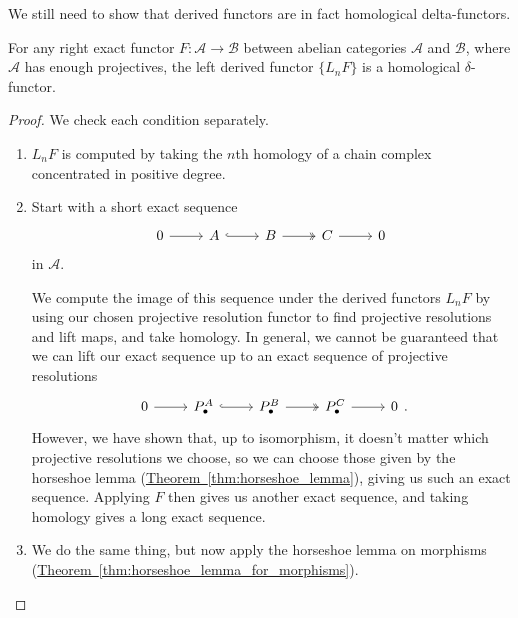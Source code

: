 \documentclass[main.tex]{subfiles}
\begin{document}
We still need to show that derived functors are in fact homological delta-functors.

\begin{theorem}
  For any right exact functor $F\colon \mathcal{A} \to \mathcal{B}$ between abelian categories $\mathcal{A}$ and $\mathcal{B}$, where $\mathcal{A}$ has enough projectives, the left derived functor $\{L_{n}F\}$ is a homological $\delta$-functor.
\end{theorem}
\begin{proof}
  We check each condition separately.
  \begin{enumerate}
    \item $L_{n}F$ is computed by taking the $n$th homology of a chain complex concentrated in positive degree.

    \item Start with a short exact sequence
      \begin{equation*}
        \begin{tikzcd}
          0
          \arrow[r]
          & A
          \arrow[r, hook]
          & B
          \arrow[r, two heads]
          & C
          \arrow[r]
          & 0
        \end{tikzcd}
      \end{equation*}
      in $\mathcal{A}$.

      We compute the image of this sequence under the derived functors $L_{n}F$ by using our chosen projective resolution functor to find projective resolutions and lift maps, and take homology. In general, we cannot be guaranteed that we can lift our exact sequence up to an exact sequence of projective resolutions
      \begin{equation*}
        \begin{tikzcd}
          0
          \arrow[r]
          & P^{A}_{\bullet}
          \arrow[r, hook]
          & P^{B}_{\bullet}
          \arrow[r, two heads]
          & P^{C}_{\bullet}
          \arrow[r]
          & 0
        \end{tikzcd}.
      \end{equation*}
      However, we have shown that, up to isomorphism, it doesn't matter which projective resolutions we choose, so we can choose those given by the horseshoe lemma (\hyperref[thm:horseshoe_lemma]{Theorem~\ref*{thm:horseshoe_lemma}}), giving us such an exact sequence. Applying $F$ then gives us another exact sequence, and taking homology gives a long exact sequence.

    \item We do the same thing, but now apply the horseshoe lemma on morphisms (\hyperref[thm:horseshoe_lemma_for_morphisms]{Theorem~\ref*{thm:horseshoe_lemma_for_morphisms}}).
  \end{enumerate}
\end{proof}
\end{document}
